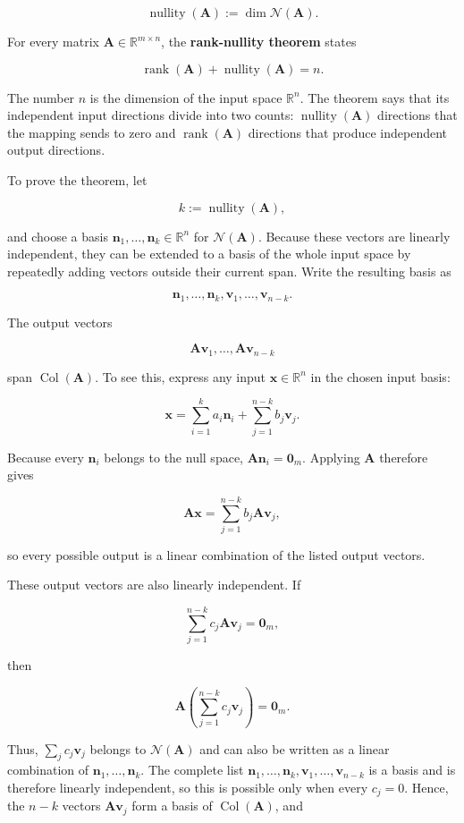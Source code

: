 \documentclass[
  australian,
  12pt,
  letterpaper,
  DIV=11,
  numbers=noendperiod,
  twoside]{scrreprt}
\begin{document}
\[
\operatorname{nullity}(\mathbf A)
\mathrel{:=}
\dim\mathcal N(\mathbf A).
\]

For every matrix \(\mathbf A\in\mathbb R^{m\times n}\), the
\textbf{rank-nullity theorem} states

\[
\boxed{
\operatorname{rank}(\mathbf A)
+
\operatorname{nullity}(\mathbf A)
=
n
}.
\]

The number \(n\) is the dimension of the input space \(\mathbb R^n\).
The theorem says that its independent input directions divide into two
counts: \(\operatorname{nullity}(\mathbf A)\) directions that the
mapping sends to zero and \(\operatorname{rank}(\mathbf A)\) directions
that produce independent output directions.

To prove the theorem, let

\[
k
\mathrel{:=}
\operatorname{nullity}(\mathbf A),
\]

and choose a basis \(\mathbf n_1,\ldots,\mathbf n_k\in\mathbb R^n\) for
\(\mathcal N(\mathbf A)\). Because these vectors are linearly
independent, they can be extended to a basis of the whole input space by
repeatedly adding vectors outside their current span. Write the
resulting basis as

\[
\mathbf n_1,\ldots,\mathbf n_k,
\mathbf v_1,\ldots,\mathbf v_{n-k}.
\]

The output vectors

\[
\mathbf A\mathbf v_1,\ldots,\mathbf A\mathbf v_{n-k}
\]

span \(\operatorname{Col}(\mathbf A)\). To see this, express any input
\(\mathbf x\in\mathbb R^n\) in the chosen input basis:

\[
\mathbf x
=
\sum_{i=1}^{k}a_i\mathbf n_i
+
\sum_{j=1}^{n-k}b_j\mathbf v_j.
\]

Because every \(\mathbf n_i\) belongs to the null space,
\(\mathbf A\mathbf n_i=\mathbf0_m\). Applying \(\mathbf A\) therefore
gives

\[
\mathbf A\mathbf x
=
\sum_{j=1}^{n-k}b_j\mathbf A\mathbf v_j,
\]

so every possible output is a linear combination of the listed output
vectors.

These output vectors are also linearly independent. If

\[
\sum_{j=1}^{n-k}c_j\mathbf A\mathbf v_j
=
\mathbf0_m,
\]

then

\[
\mathbf A
\left(
\sum_{j=1}^{n-k}c_j\mathbf v_j
\right)
=
\mathbf0_m.
\]

Thus, \(\sum_j c_j\mathbf v_j\) belongs to \(\mathcal N(\mathbf A)\) and
can also be written as a linear combination of
\(\mathbf n_1,\ldots,\mathbf n_k\). The complete list
\(\mathbf n_1,\ldots,\mathbf n_k,\mathbf v_1,\ldots,\mathbf v_{n-k}\) is
a basis and is therefore linearly independent, so this is possible only
when every \(c_j=0\). Hence, the \(n-k\) vectors
\(\mathbf A\mathbf v_j\) form a basis of
\(\operatorname{Col}(\mathbf A)\), and
\end{document}
